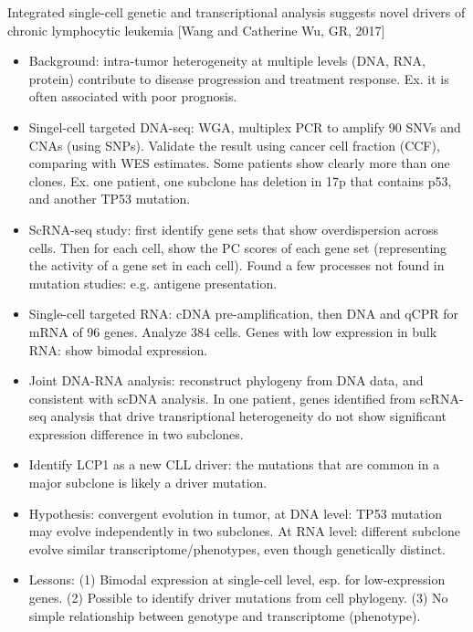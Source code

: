 \documentclass{report}
\begin{document}
Integrated single-cell genetic and transcriptional analysis suggests novel drivers of chronic lymphocytic leukemia [Wang and Catherine Wu, GR, 2017]
\begin{itemize}
	
	\item Background: intra-tumor heterogeneity at multiple levels (DNA, RNA, protein) contribute to disease progression and treatment response. Ex. it is often associated with poor prognosis. 
	
	\item Singel-cell targeted DNA-seq: WGA, multiplex PCR to amplify 90 SNVs and CNAs (using SNPs). Validate the result using cancer cell fraction (CCF), comparing with WES estimates. Some patients show clearly more than one clones. Ex. one patient, one subclone has deletion in 17p that contains p53, and another TP53 mutation.  
	
	\item ScRNA-seq study: first identify gene sets that show overdispersion across cells. Then for each cell, show the PC scores of each gene set (representing the activity of a gene set in each cell). Found a few processes not found in mutation studies: e.g. antigene presentation. 
	
	\item Single-cell targeted RNA: cDNA pre-amplification, then DNA and qCPR for mRNA of 96 genes. Analyze 384 cells. Genes with low expression in bulk RNA: show bimodal expression. 
	
	\item Joint DNA-RNA analysis: reconstruct phylogeny from DNA data, and consistent with scDNA analysis. In one patient, genes identified from scRNA-seq analysis that drive transriptional heterogeneity do not show significant expression difference in two subclones. 
	
	\item Identify LCP1 as a new CLL driver: the mutations that are common in a major subclone is likely a driver mutation. 
	
	\item Hypothesis: convergent evolution in tumor, at DNA level: TP53 mutation may evolve independently in two subclones. At RNA level: different subclone evolve similar transcriptome/phenotypes, even though genetically distinct. 
	
	\item Lessons: (1) Bimodal expression at single-cell level, esp. for low-expression genes. (2) Possible to identify driver mutations from cell phylogeny. (3) No simple relationship between genotype and transcriptome (phenotype). 
\end{itemize}
\end{document}
